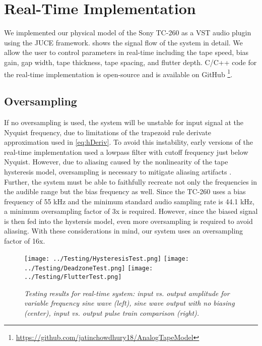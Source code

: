 \documentclass[twoside,a4paper]{article}
\begin{document}
\section{Real-Time Implementation}
We implemented our physical model of the Sony TC-260 as a
VST audio plugin using the JUCE framework. 
shows the signal flow of the system in detail. We allow the user
to control parameters in real-time including the tape speed, bias gain, gap
width, tape thickness, tape spacing, and flutter depth. 
C/C++ code for the real-time implementation is open-source
and is available on GitHub
\footnote{\url{https://github.com/jatinchowdhury18/AnalogTapeModel}}.

%
\subsection{Oversampling}
If no oversampling is used, the system will be unstable
for input signal at the Nyquist frequency, due to limitations
of the trapezoid rule derivate approximation used in \cref{eq:hDeriv}.
To avoid this instability, early versions of the real-time
implementation used a lowpass filter with cutoff frequency
just below Nyquist. However, due to aliasing caused by the
nonlinearity of the tape hysteresis model, oversampling is
necessary to mitigate aliasing artifacts \cite{Yeh}. Further,
the system must be able to faithfully recreate not only the
frequencies in the audible range but the bias frequency as
well. Since the TC-260 uses a bias frequency of 55 kHz \cite{RefManual}
and the minimum standard audio sampling rate is 44.1 kHz,
a minimum oversampling factor of 3x is required. However,
since the biased signal is then fed into the hystersis model,
even more oversampling is required to avoid aliasing. With these
considerations in mind, our system uses an oversampling
factor of 16x.


\begin{figure*}[!ht]
    \texttt{[image: ../Testing/HysteresisTest.png]}
    \texttt{[image: ../Testing/DeadzoneTest.png]}
    \texttt{[image: ../Testing/FlutterTest.png]}
    \caption{\label{tests}{\it Testing results for real-time system:
                                    input vs. output amplitude for variable
                                    frequency sine wave (left), sine wave output
                                    with no biasing (center), input vs. output
                                    pulse train comparison (right).}}
\end{figure*}
%
\end{document}
